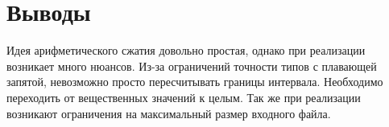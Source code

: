 \section*{Выводы}
Идея арифметического сжатия довольно простая, однако
при реализации возникает много нюансов. Из-за ограничений
точности типов с плавающей запятой, невозможно просто пересчитывать
границы интервала. Необходимо переходить от вещественных значений к целым.
Так же при реализации возникают ограничения на максимальный размер входного
файла.

\pagebreak


